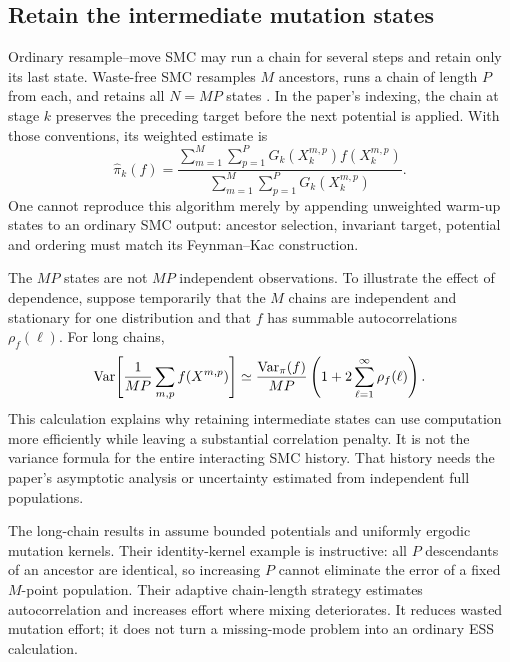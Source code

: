 \subsection{Retain the intermediate mutation states}

Ordinary resample--move SMC may run a chain for several steps and retain
only its last state. Waste-free SMC resamples $M$ ancestors, runs a chain of
length $P$ from each, and retains all $N=MP$ states
\citep[Section 2.4, Algorithm 2]{dau2022wastefree}. In the paper's indexing,
the chain at stage $k$ preserves the preceding target before the next
potential is applied. With those conventions, its weighted estimate is
\begin{equation}
 \widehat\pi_k(f)=
 \frac{\sum_{m=1}^M\sum_{p=1}^P
                  G_k(X_k^{m,p})f(X_k^{m,p})}
      {\sum_{m=1}^M\sum_{p=1}^P G_k(X_k^{m,p})}.
 \label{eq:bf-is-wastefree-estimate}
\end{equation}
One cannot reproduce this algorithm merely by appending unweighted warm-up
states to an ordinary SMC output: ancestor selection, invariant target,
potential and ordering must match its Feynman--Kac construction.

The $MP$ states are not $MP$ independent observations. To illustrate the
effect of dependence, suppose temporarily that the $M$ chains are independent
and stationary for one distribution and that $f$ has summable
autocorrelations $\rho_f(\ell)$. For long chains,
\begin{equation}
 \operatorname{Var}\!\left[\frac{1}{MP}\sum_{m,p}f(X^{m,p})\right]
 \simeq\frac{\operatorname{Var}_\pi(f)}{MP}
       \left(1+2\sum_{\ell=1}^{\infty}\rho_f(\ell)\right).
 \label{eq:bf-is-wastefree-autocorrelation}
\end{equation}
This calculation explains why retaining intermediate states can use
computation more efficiently while leaving a substantial correlation
penalty. It is not the variance formula for the entire interacting SMC
history. That history needs the paper's asymptotic analysis or uncertainty
estimated from independent full populations.

The long-chain results in \citet[Section 3.1]{dau2022wastefree} assume
bounded potentials and uniformly ergodic mutation kernels. Their
identity-kernel example is instructive: all $P$ descendants of an ancestor
are identical, so increasing $P$ cannot eliminate the error of a fixed
$M$-point population. Their adaptive chain-length strategy estimates
autocorrelation and increases effort where mixing deteriorates. It reduces
wasted mutation effort; it does not turn a missing-mode problem into an
ordinary ESS calculation.

